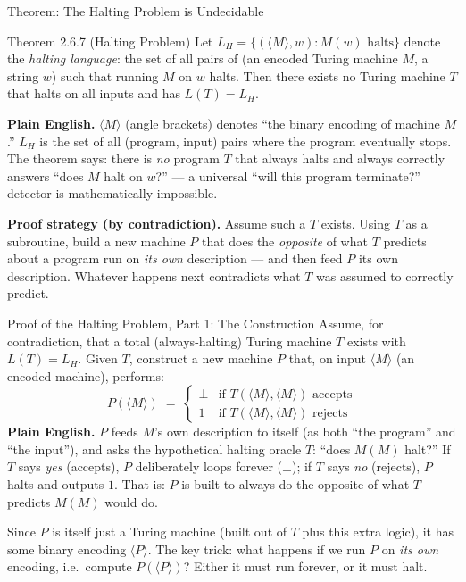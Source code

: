 \documentclass[aspectratio=169,10pt]{beamer}
\begin{document}
\begin{frame}{Theorem: The Halting Problem is Undecidable}
  \begin{block}{Theorem 2.6.7 (Halting Problem)}
    Let $L_H = \{ (\langle M \rangle, w) : M(w) \text{ halts} \}$ denote the
    \emph{halting language}: the set of all pairs of (an encoded Turing
    machine $M$, a string $w$) such that running $M$ on $w$ halts. Then there
    exists no Turing machine $T$ that halts on all inputs and has
    $L(T) = L_H$.
  \end{block}
  \textbf{Plain English.} $\langle M \rangle$ (angle brackets) denotes ``the
  binary encoding of machine $M$.'' $L_H$ is the set of all (program,
  input) pairs where the program eventually stops. The theorem says: there is
  \emph{no} program $T$ that always halts and always correctly answers ``does
  $M$ halt on $w$?'' --- a universal ``will this program terminate?''
  detector is mathematically impossible.

  \vspace{2mm}
  \textbf{Proof strategy (by contradiction).} Assume such a $T$ exists. Using
  $T$ as a subroutine, build a new machine $P$ that does the \emph{opposite} of
  what $T$ predicts about a program run on \emph{its own} description --- and
  then feed $P$ its own description. Whatever happens next contradicts what
  $T$ was assumed to correctly predict.
\end{frame}

\begin{frame}{Proof of the Halting Problem, Part 1: The Construction}
  Assume, for contradiction, that a total (always-halting) Turing machine $T$
  exists with $L(T) = L_H$. Given $T$, construct a new machine $P$ that, on
  input $\langle M \rangle$ (an encoded machine), performs:
  \[
    P(\langle M \rangle) \;=\;
    \begin{cases}
      \bot & \text{if } T(\langle M \rangle, \langle M \rangle) \text{ accepts} \\
      1 & \text{if } T(\langle M \rangle, \langle M \rangle) \text{ rejects}
    \end{cases}
  \]
  \textbf{Plain English.} $P$ feeds $M$'s own description to itself (as both
  ``the program'' and ``the input''), and asks the hypothetical halting oracle
  $T$: ``does $M(M)$ halt?'' If $T$ says \emph{yes} (accepts), $P$
  deliberately loops forever ($\bot$); if $T$ says \emph{no} (rejects), $P$
  halts and outputs $1$. That is: $P$ is built to always do the opposite of
  what $T$ predicts $M(M)$ would do.

  \vspace{2mm}
  Since $P$ is itself just a Turing machine (built out of $T$ plus this extra
  logic), it has some binary encoding $\langle P \rangle$. The key trick: what
  happens if we run $P$ on \emph{its own} encoding, i.e.\ compute
  $P(\langle P \rangle)$? Either it must run forever, or it must halt.
\end{frame}
\end{document}
